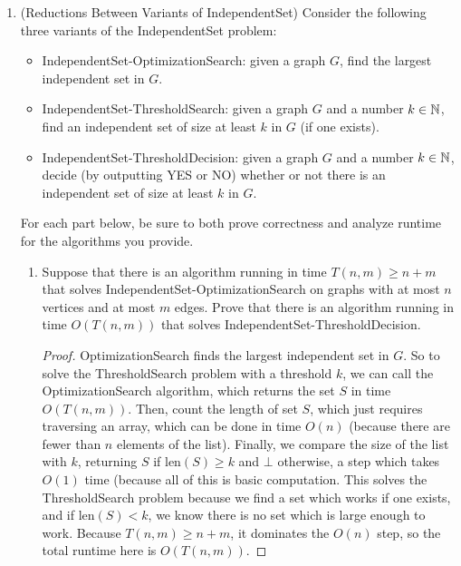 \documentclass[11pt]{article}
\begin{document}
\begin{enumerate}
\begin{enumerate}
\begin{proof}
The results here are not *that* illuminating - we find that ISET-BFS outperforms exhaustive coloring generally, but large cases are not wonderful for either algorithm. This makes sense - there is no pattern to the arrangement, so we generally expect ISET-BFS to outperform exhaustive search pretty well, but we'd need more granular tests than what was given to get a strong idea of how much better it is. But this is the result we expect with pretty random graphs - exponential time is not a great runtime, even if the base of the exponent can be reduced (as we do with ISET-BFS).
\end{proof}
      
  \end{enumerate}

 \item (Reductions Between Variants of IndependentSet) 
 Consider the following three variants of the IndependentSet problem:
 \begin{itemize}
     \item IndependentSet-OptimizationSearch: given a graph $G$, find the largest independent set in $G$.
     \item IndependentSet-ThresholdSearch: given a graph $G$ and a number $k\in \mathbb{N}$, find an independent set of size at least $k$ in $G$ (if one exists).
     \item IndependentSet-ThresholdDecision: given a graph $G$ and a number $k\in \mathbb{N}$, decide (by outputting YES or NO) whether or not there is an independent set of size at least $k$ in $G$. 
 \end{itemize}
For each part below, be sure to both prove correctness and analyze runtime for the algorithms you provide.

 \begin{enumerate}
 \item Suppose that there is an algorithm running in time $T(n,m)\geq n+m$ that solves IndependentSet-OptimizationSearch on graphs with at most $n$ vertices and at most $m$ edges.  Prove that there is an algorithm running in time $O(T(n,m))$ that solves IndependentSet-ThresholdDecision. 
 
 \begin{proof}
OptimizationSearch finds the largest independent set in $G$. So to solve the ThresholdSearch problem with a threshold $k$, we can call the OptimizationSearch algorithm, which returns the set $S$ in time $O(T(n, m))$. Then, count the length of set $S$, which just requires traversing an array, which can be done in time $O(n)$ (because there are fewer than $n$ elements of the list). Finally, we compare the size of the list with $k$, returning $S$ if $\text{len} (S) \geq k$ and $\bot$ otherwise, a step which takes $O(1)$ time (because all of this is basic computation. This solves the ThresholdSearch problem because we find a set which works if one exists, and if $\text{len} (S) < k$, we know there is no set which is large enough to work. Because $T(n, m) \geq n + m$, it dominates the $O(n)$ step, so the total runtime here is $O(T(n, m))$.
 \end{proof}
 

\end{enumerate}
\end{enumerate}
\end{document}
